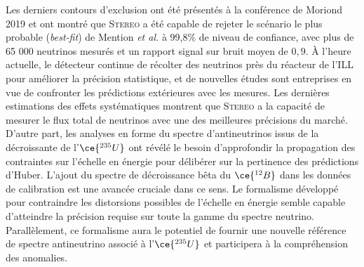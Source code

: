 Les derniers contours d'exclusion ont été présentés à la conférence de Moriond 2019 \cite{docdb849} et ont montré que \textsc{Stereo} a été capable de rejeter le scénario le plus probable (\textit{best-fit}) de Mention \textit{et al.} à 99,8\% de niveau de confiance, avec plus de 65 000 neutrinos mesurés et un rapport signal sur bruit moyen de $0,9$. À l'heure actuelle, le détecteur continue de récolter des neutrinos près du réacteur de l'ILL pour améliorer la précision statistique, et de nouvelles études sont entreprises en vue de confronter les prédictions extérieures avec les mesures. Les dernières estimations des effets systématiques montrent que \textsc{Stereo} a la capacité de mesurer le flux total de neutrinos avec une des meilleures précisions du marché. D'autre part, les analyses en forme du spectre d'antineutrinos issus de la décroissante de l'$\ce{^{235}U}$ ont révélé le besoin d'approfondir la propagation des contraintes sur l'échelle en énergie pour délibérer sur la pertinence des prédictions d'Huber. L'ajout du spectre de décroissance bêta du $\ce{^{12}B}$ dans les données de calibration est une avancée cruciale dans ce sens. Le formalisme développé pour contraindre les distorsions possibles de l'échelle en énergie semble capable d'atteindre la précision requise sur toute la gamme du spectre neutrino. Parallèlement, ce formalisme aura le potentiel de fournir une nouvelle référence de spectre antineutrino associé à l'$\ce{^{235}U}$ et participera à la compréhension des anomalies.\\


